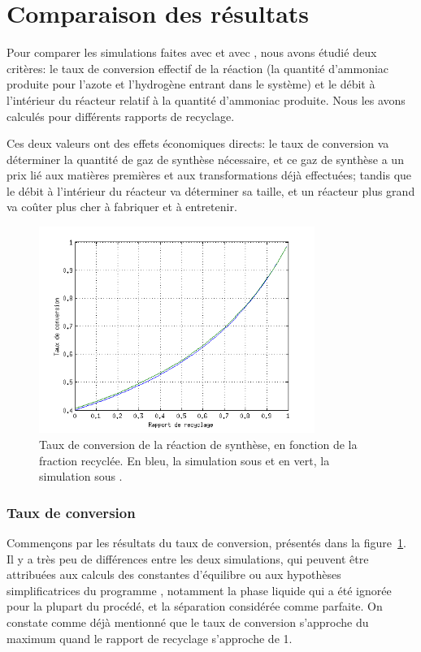 \section{Comparaison des résultats}

Pour comparer les simulations faites avec \matlab{} et avec \aspen{},
nous avons étudié deux critères:
le taux de conversion effectif de la réaction (la quantité d'ammoniac
produite pour l'azote et l'hydrogène entrant dans le système)
et le débit à l'intérieur du réacteur relatif à la quantité d'ammoniac
produite.
Nous les avons calculés pour différents rapports de recyclage.

Ces deux valeurs ont des effets économiques directs:
le taux de conversion va déterminer la quantité de gaz de synthèse nécessaire,
et ce gaz de synthèse a un prix lié aux matières premières et aux
transformations déjà effectuées;
tandis que le débit à l'intérieur du réacteur va déterminer sa taille,
et un réacteur plus grand va coûter plus cher à fabriquer et à entretenir.

\begin{figure}
    \centering
    \includegraphics[width=0.8\textwidth]{img/yield}
    \caption{
        Taux de conversion de la réaction de synthèse,
        en fonction de la fraction recyclée.
        En bleu, la simulation sous \matlab{} et en vert,
        la simulation sous \aspen{}.
    }
    \label{fig:yield}
\end{figure}

\subsubsection{Taux de conversion}

Commençons par les résultats du taux de conversion, présentés dans la
figure~\ref{fig:yield}.
Il y a très peu de différences entre les deux simulations,
qui peuvent être attribuées aux calculs des constantes d'équilibre
ou aux hypothèses simplificatrices du programme \matlab{}, notamment
la phase liquide qui a été ignorée pour la plupart du procédé,
et la séparation considérée comme parfaite.
On constate comme déjà mentionné que le taux de conversion s'approche
du maximum quand le rapport de recyclage s'approche de 1.

